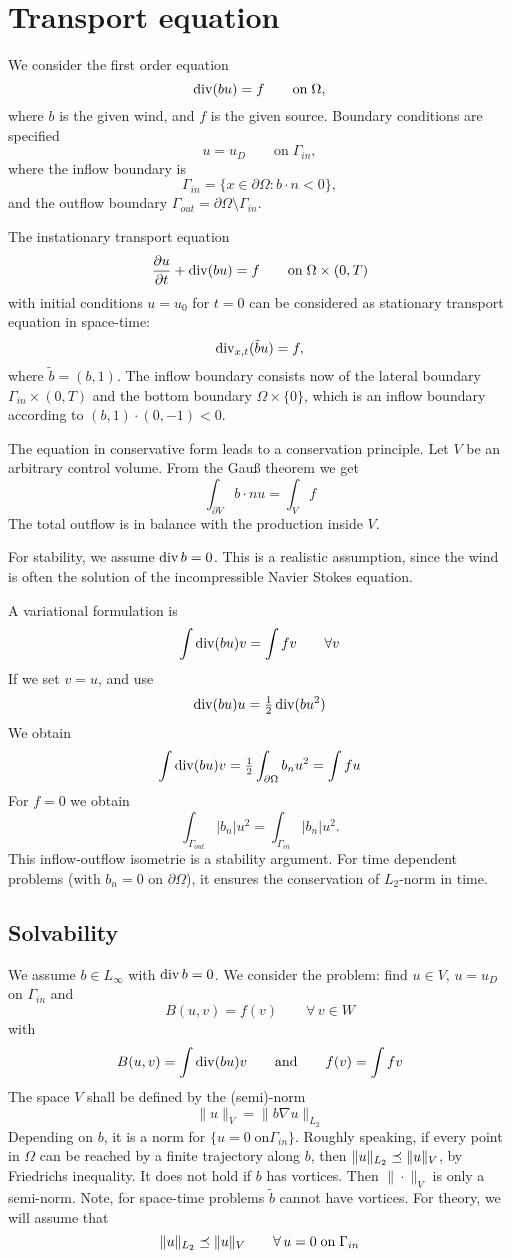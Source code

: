 \section{Transport equation}
We consider the first order equation
$$
\operatorname{div} (bu) = f  \qquad \text{on}  \; \Omega,
$$
where $b$ is the given wind, and $f$ is the given source.
Boundary conditions are specified
$$
u = u_D \qquad \text{on} \; \Gamma_{in},
$$
where the inflow boundary is 
$$
\Gamma_{in} = \{ x \in \partial \Omega : b \cdot n < 0 \},
$$
and the outflow boundary $\Gamma_{out} = \partial \Omega \setminus
\Gamma_{in}$.

The instationary transport equation
$$
\frac{\partial u}{\partial t}  + \operatorname{div} (bu) = f  \qquad \text{on}  \;
\Omega \times (0,T)
$$
with initial conditions $u = u_0$ for $t = 0$ can be considered as
stationary transport equation in space-time:
$$
\operatorname{div}_{x,t} (\tilde b u) = f,
$$
where $\tilde b = (b, 1)$. The inflow boundary consists now of the
lateral boundary $\Gamma_{in} \times (0,T)$ and the bottom
 boundary  $\Omega \times \{0 \}$, which is an inflow boundary according
 to $(b, 1) \cdot (0,-1) < 0$.


The equation in conservative form leads to a conservation
principle. Let $V$ be an arbitrary control volume. From the Gau\ss{}
theorem we get
$$
\int_{\partial V} b\cdot n u = \int_V f
$$
The total outflow is in balance with the production inside $V$.


For stability, we assume $\operatorname{div} b = 0$.  This is a realistic
assumption, since the wind is often the solution of the
incompressible Navier Stokes equation.

A variational formulation is
$$
\int \operatorname{div} (bu) v = \int f v \qquad \forall v 
$$
If we set $v = u$, and use
$$
\operatorname{div} (bu) u =  \tfrac{1}{2} \operatorname{div} (b u^2)
$$
We obtain
$$
\int \operatorname{div} (b u) v = \tfrac{1}{2} \int_{\partial \Omega} b_n u^2 =
\int f u
$$
For $f = 0$ we obtain 
$$
\int_{\Gamma_{out}} |b_n| u^2 = \int_{\Gamma_{in}} | b_n | u^2.
$$
This inflow-outflow isometrie is a stability argument. For time dependent problems
(with $b_n = 0$ on $\partial \Omega$), it ensures the conservation of
$L_2$-norm in time.

\subsection{Solvability}

We assume $b \in L_\infty$ with $\operatorname{div} b = 0$. We consider the problem: find $u \in V$,
$u = u_D$ on $\Gamma_{in}$ and 
$$
B(u,v) = f(v) \qquad \forall \, v \in W
$$
with 
$$
B(u,v) = \int \operatorname{div} (bu) v \qquad \text{and} \qquad f(v) = \int f v 
$$
The space $V$ shall be defined by the (semi)-norm
$$
\| u \|_V = \| b \nabla u \|_{L_2}
$$
Depending on $b$, it is a norm for $\{ u = 0 \; \text{on} \Gamma_{in}
\}$. Roughly speaking, if every point in $\Omega$ can be reached by a
finite trajectory along $b$, then $\| u \|_{L_2} \preceq \| u \|_V$, by
Friedrichs inequality. It does not hold if $b$ has vortices. Then
$\| \cdot \|_V$ is only a semi-norm. Note, for space-time problems
$\tilde b$ cannot have vortices. For theory, we will assume that
$$
\| u \|_{L_2} \preceq \| u \|_V \qquad \forall \, u = 0 \; \text{on} \; \Gamma_{in}
$$

